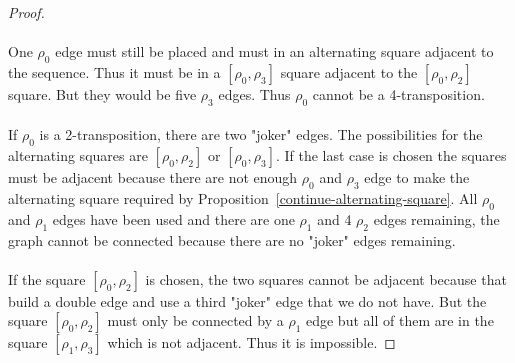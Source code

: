 \begin{proof}
\begin{figure}[H]
\begin{center}
      \caption{}
    \end{center}
  \end{figure}

  \paragraph{}
  One $\rho_0$ edge must still be placed and must in an alternating square adjacent to the sequence. Thus it must be in a $[\rho_0, \rho_3]$ square adjacent to the $[\rho_0, \rho_2]$ square. But they would be five $\rho_3$ edges. Thus $\rho_0$ cannot be a 4-transposition.

  \paragraph{}
  If $\rho_0$ is a 2-transposition, there are two "joker" edges. The possibilities for the alternating squares are $[\rho_0, \rho_2]$ or $[\rho_0, \rho_3]$. If the last case is chosen the squares must be adjacent because there are not enough $\rho_0$ and $\rho_3$ edge to make the alternating square required by Proposition~\ref{continue-alternating-square}. All $\rho_0$ and $\rho_1$ edges have been used and there are one $\rho_1$ and 4 $\rho_2$ edges remaining, the graph cannot be connected because there are no "joker" edges remaining.

  \paragraph{}
  If the square $[\rho_0, \rho_2]$ is chosen, the two squares cannot be adjacent because that build a double edge and use a third "joker" edge that we do not have. But the square $[\rho_0, \rho_2]$ must only be connected by a $\rho_1$ edge but all of them are in the square $[\rho_1, \rho_3]$ which is not adjacent. Thus it is impossible.


\end{proof}

